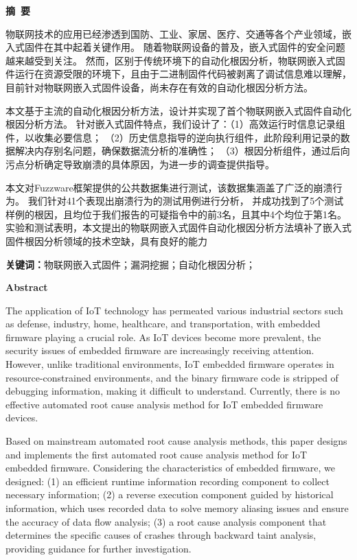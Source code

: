 \cleardoublepage{}
\begin{center}
    \bfseries {} 摘~要
\end{center}

物联网技术的应用已经渗透到国防、工业、家居、医疗、交通等各个产业领域，嵌入式固件在其中起着关键作用。
随着物联网设备的普及，嵌入式固件的安全问题越来越受到关注。
然而，区别于传统环境下的自动化根因分析，物联网嵌入式固件运行在资源受限的环境下，且由于二进制固件代码被剥离了调试信息难以理解，
目前针对物联网嵌入式固件设备，尚未存在有效的自动化根因分析方法。

本文基于主流的自动化根因分析方法，设计并实现了首个物联网嵌入式固件自动化根因分析方法。
针对嵌入式固件特点，我们设计了：（1）高效运行时信息记录组件，以收集必要信息；
（2）历史信息指导的逆向执行组件，此阶段利用记录的数据解决内存别名问题，确保数据流分析的准确性；
（3）根因分析组件，通过后向污点分析确定导致崩溃的具体原因，为进一步的调查提供指导。

本文对Fuzzware框架提供的公共数据集进行测试，该数据集涵盖了广泛的崩溃行为。
我们针对41个表现出崩溃行为的测试用例进行分析，
并成功找到了5个测试样例的根因，且均位于我们报告的可疑指令中的前3名，且其中4个均位于第1名。
实验和测试表明，本文提出的物联网嵌入式固件自动化根因分析方法填补了嵌入式固件根因分析领域的技术空缺，具有良好的能力


\textbf{关键词：}物联网嵌入式固件；漏洞挖掘；自动化根因分析；

\cleardoublepage{}
\begin{center}
    \bfseries {} Abstract
\end{center}

The application of IoT technology has permeated various industrial sectors such as defense, industry, home, healthcare, and transportation, with embedded firmware playing a crucial role. As IoT devices become more prevalent, the security issues of embedded firmware are increasingly receiving attention. However, unlike traditional environments, IoT embedded firmware operates in resource-constrained environments, and the binary firmware code is stripped of debugging information, making it difficult to understand. Currently, there is no effective automated root cause analysis method for IoT embedded firmware devices.

Based on mainstream automated root cause analysis methods, this paper designs and implements the first automated root cause analysis method for IoT embedded firmware. Considering the characteristics of embedded firmware, we designed: (1) an efficient runtime information recording component to collect necessary information; (2) a reverse execution component guided by historical information, which uses recorded data to solve memory aliasing issues and ensure the accuracy of data flow analysis; (3) a root cause analysis component that determines the specific causes of crashes through backward taint analysis, providing guidance for further investigation.

